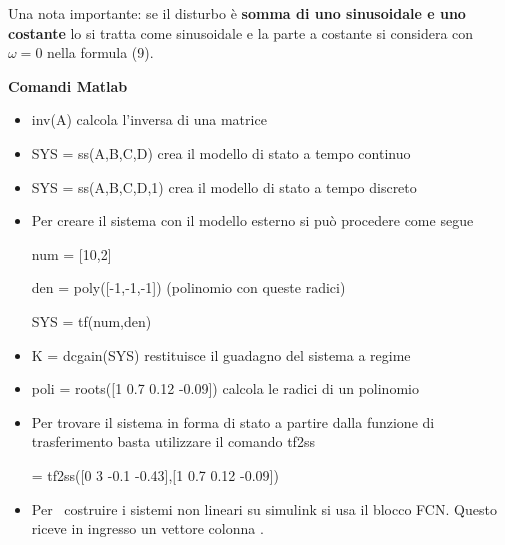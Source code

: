 \documentclass[10pt,a4paper]{book}
\begin{document}
\begin{figure}[htpb]
\end{figure}\FloatBarrier

Una nota importante: se il disturbo è \textbf{somma di uno sinusoidale e uno costante} lo si tratta come sinusoidale e la parte a costante si considera con $\omega =0$ nella formula (9).



\newpage

\textbf{Comandi Matlab}


\begin{itemize}
\item {\selectfont inv(A)} calcola l’inversa di una matrice
\item {\selectfont SYS = ss(A,B,C,D)} crea il modello di stato a tempo continuo
\item {\selectfont SYS = ss(A,B,C,D,1)} crea il modello di stato a tempo discreto
\item Per creare il sistema con il modello esterno si può procedere come segue

{\selectfont num = [10,2]}

{\selectfont den = poly([-1,-1,-1])} (polinomio con queste radici)

{\selectfont SYS = tf(num,den)}
\item {\selectfont K = dcgain(SYS)} restituisce il guadagno del sistema a regime
\item {\selectfont poli = roots([1 0.7 0.12 -0.09])} calcola le radici di un polinomio
\item Per trovare il sistema in forma di stato a partire dalla funzione di trasferimento basta utilizzare il comando tf2ss

{\selectfont [A,B,C,D] = tf2ss([0 3 -0.1 -0.43],[1 0.7 0.12 -0.09])}
\item Per \ costruire i sistemi non lineari su simulink si usa il blocco FCN. Questo riceve in ingresso un vettore colonna {\selectfont [u(1)…u(n)]}.
\end{itemize}
\end{document}
